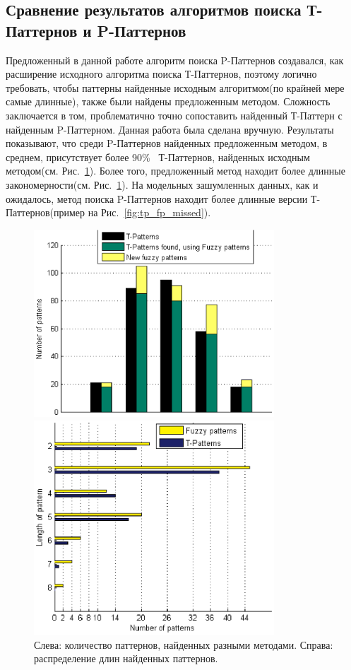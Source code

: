 \documentclass[12pt,fсeqn]{article}
\begin{document}
\subsection{Сравнение результатов алгоритмов поиска Т-Паттернов и P-Паттернов }
Предложенный в данной работе алгоритм поиска P-Паттернов создавался, как расширение
исходного алгоритма поиска Т-Паттернов, поэтому логично требовать, чтобы паттерны найденные
исходным алгоритмом(по крайней мере самые длинные), также были найдены предложенным методом. Сложность заключается
в том, проблематично точно сопоставить найденный Т-Паттерн с найденным P-Паттерном. Данная работа была
сделана вручную. Результаты показывают, что среди P-Паттернов найденных предложенным методом, в среднем, присутствует более 90\%~\cite{MB_article} 
Т-Паттернов, найденных исходным методом(см. Рис.~\ref{fig:tp_fp_cmp}). Более того, предложенный метод находит более длинные закономерности(см. Рис.~\ref{fig:tp_fp_cmp}).
На модельных зашумленных данных, как и ожидалось, метод поиска P-Паттернов находит более длинные версии Т-Паттернов(пример на Рис.~\ref{fig:tp_fp_missed}).
\begin{figure}[H]
	\begin{multicols}{2}
	\hfill\vfill
	\includegraphics[width=90mm]{exx.eps}

	\includegraphics[width=90mm]{hist.eps}
	\end{multicols}
	\caption{Слева: количество паттернов, найденных разными методами. Справа: распределение длин найденных паттернов.}
\label{fig:tp_fp_cmp}
\end{figure}
\end{document}
